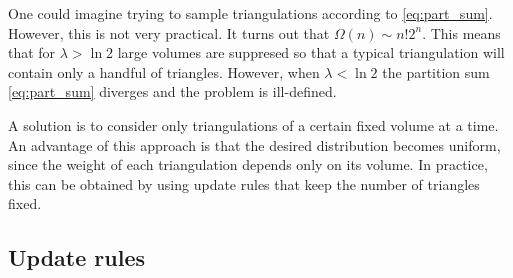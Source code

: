 One could imagine trying to sample triangulations according to \eqref{eq:part_sum}.
However, this is not very practical. It turns out that $\Omega(n) \sim n! 2^n$. This means that for $\lambda > \ln 2$ large volumes are suppresed so that a typical triangulation will contain only a handful of triangles.
However, when $\lambda < \ln 2$ the partition sum \eqref{eq:part_sum} diverges and the problem is ill-defined.

A solution is to consider only triangulations of a certain fixed volume at a time.
An advantage of this approach is that the desired distribution becomes uniform, since the weight of each triangulation depends only on its volume.
In practice, this can be obtained by using update rules that keep the number of triangles fixed.

\subsection{Update rules}

